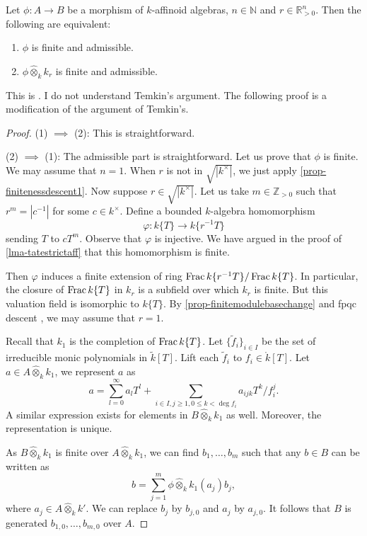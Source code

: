 \begin{proposition}\label{prop-finiteadmissibledesc}
    Let $\phi:A\rightarrow B$ be a morphism of $k$-affinoid algebras, $n\in \mathbb{N}$ and $r\in \mathbb{R}^n_{>0}$. Then the following are equivalent:
    \begin{enumerate}
        \item $\phi$ is finite and admissible.
        \item $\phi\hat{\otimes}_k k_r$ is finite and admissible.
    \end{enumerate}
\end{proposition}
This is \cite[Lemma~3.2]{Tem04}. I do not understand Temkin's argument. The following proof is a modification of the argument of Temkin's.
\begin{proof}
    (1) $\implies$ (2): This is straightforward.

    (2) $\implies$ (1): The admissible part is straightforward. Let us prove that $\phi$ is finite. We may assume that $n=1$. When $r$ is not in $\sqrt{|k^{\times}|}$, we just apply \cref{prop-finitenessdescent1}. Now suppose $r\in\sqrt{|k^{\times}|}$. 
    Let us take $m\in \mathbb{Z}_{>0}$ such that $r^m=|c^{-1}|$ for some $c\in k^{\times}$. Define a bounded $k$-algebra homomorphism
    \[
        \varphi:k\{T\}\rightarrow k\{r^{-1} T\}
    \]
    sending $T$ to $cT^m$. Observe that $\varphi$ is injective.
    We have argued in the proof of \cref{lma-tatestrictaff} that this homomorphism is finite. 

    Then $\varphi$ induces a finite extension of ring $\operatorname{Frac}  k\{r^{-1} T\}/\operatorname{Frac} k\{T\}$. In particular, the closure of $\operatorname{Frac} k\{T\}$ in $k_r$ is a subfield over which $k_r$ is finite. 
    But this valuation field is isomorphic to $k\{T\}$. By \cref{prop-finitemodulebasechange} and fpqc descent \cite[\href{https://stacks.math.columbia.edu/tag/02LA}{Tag 02LA}]{stacks-project}, we may assume that $r=1$.

    Recall that $k_1$ is the completion of $\operatorname{Frac} k\{T\}$.
    Let $\{\tilde{f}_i\}_{i\in I}$ be the set of irreducible monic polynomials in $\tilde{k}[T]$. Lift each $\tilde{f}_i$ to $f_i\in \mathring{k}[T]$. Let $a\in A\hat{\otimes}_k k_1$, we represent $a$ as
    \[
        a=\sum_{l=0}^{\infty} a_l T^l+\sum_{i\in I, j\geq 1,0\leq k<\deg f_i}a_{ijk}T^k/f_i^j.
    \]
    A similar expression exists for elements in $B\hat{\otimes}_k k_1$ as well. Moreover, the representation is unique.

    As $B\hat{\otimes}_k k_1$ is finite over $A\hat{\otimes}_k k_1$, we can find $b_1,\ldots,b_m$ such that any $b\in B$ can be written as
    \[
        b=\sum_{j=1}^m \phi\hat{\otimes}_k k_1(a_j) b_j,
    \]
    where $a_j\in A\hat{\otimes}_k k'$. We can replace $b_j$ by $b_{j,0}$ and $a_j$ by $a_{j,0}$. It follows that $B$ is generated $b_{1,0},\ldots,b_{m,0}$ over $A$.
\end{proof}

